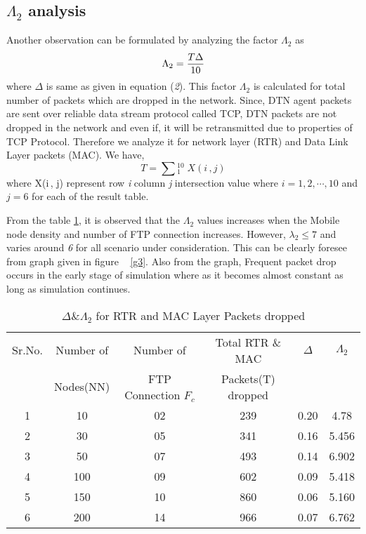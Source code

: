 \documentclass[3p,times]{elsarticle}
\begin{document}
\subsection{$\Lambda_2$ analysis}   
Another observation can be formulated by analyzing the factor $ \Lambda_2 $ as 
\begin{equation}
 \Lambda_2   = \frac {T \* \Delta}{10} 
\end{equation}
where $\Delta$ is same as given in equation (\emph{2}).
This factor $ \Lambda_2 $ is calculated for total number of packets which are dropped in the network. Since, DTN agent packets are sent over reliable data stream protocol called TCP, DTN packets are not dropped in the network and even if, it will be retransmitted due to properties of TCP Protocol. Therefore we analyze it for network layer (RTR) and Data Link Layer packets (MAC). We have, 
\begin{equation}
T = \sum{_{1}^{10}} \; X(i\,,j)
\end{equation}
where X(i\,, j) represent row \emph{i} column \emph{j} intersection value where $ i= 1,2,\cdots, 10 $ and $ j=6 $ for each of the result table.

From the table \ref{t16}, it is observed that the $\Lambda_2$ values increases when the Mobile node density and number of FTP connection increases. However, \emph{$\lambda_2 \le 7 $} and varies around \emph{6} for all scenario under consideration. This can be clearly foresee from graph given in figure ~ \ref{g3}. Also from the graph, Frequent packet drop occurs in the early stage of simulation where as it becomes almost constant as long as simulation continues.
\begin{table}[h]
\centering
\caption{$ \Delta \& \Lambda_2 $ for RTR and MAC Layer Packets dropped}
\begin{tabular}{|c|c|c|c|c|c|}
\hline
Sr.No. & Number of  & Number of  & Total RTR \& MAC  & $ \Delta $ & $ \Lambda_2 $ \\
 &  Nodes(NN) &  FTP Connection $F_c$ &  Packets(T) dropped && \\
\hline
1 & 10 & 02 & 239 & 0.20 & 4.78 \\
2 & 30 & 05 & 341 & 0.16 & 5.456\\
3 & 50 & 07 & 493 & 0.14 & 6.902 \\
4 & 100 & 09 & 602 & 0.09 & 5.418 \\
5 & 150 & 10 & 860 & 0.06 & 5.160 \\
6 & 200 & 14 & 966 & 0.07 & 6.762 \\
\hline
\end{tabular}
\label{t16}
\end{table}
   
\end{document}
